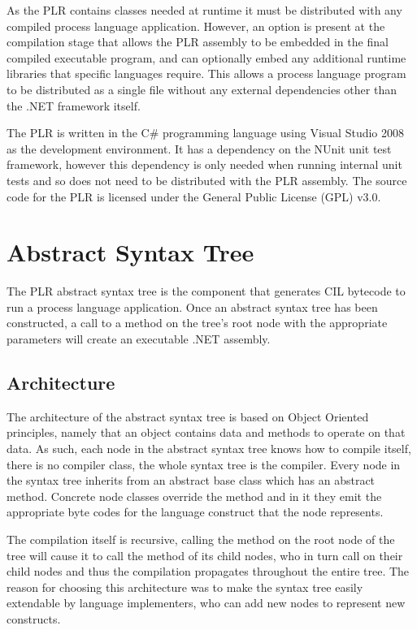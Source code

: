 	As the PLR contains classes needed at runtime it must be distributed with 
	any compiled process language application. However, an option is present at 
	the compilation stage that allows the PLR assembly to be embedded in the 
	final compiled executable program, and can optionally embed any additional 
	runtime libraries that specific languages require. This allows a process 
	language program to be distributed as a single file without any external 
	dependencies other than the .NET framework itself.

	The PLR is written in the C\# programming language using Visual 
	Studio 2008 as the development environment. It has a dependency on the NUnit 
	unit test framework, however this dependency is only needed when running 
	internal unit tests and so does not need to be distributed with the PLR 
	assembly. The source code for the PLR is licensed under the General Public 
	License (GPL) v3.0.
	
\section{Abstract Syntax Tree}

	The PLR abstract syntax tree is the component that generates CIL 
	bytecode to run a process language application. Once an abstract syntax tree 
	has been constructed, a call to a  method on the tree's root 
	node with the appropriate parameters will create an executable .NET 
	assembly. 

\subsection{Architecture}

	The architecture of the abstract syntax tree is based on Object Oriented 
	principles, namely that an object contains data and methods to operate on 
	that data. As such, each node in the abstract syntax tree knows how to 
	compile itself, there is no compiler class, the whole syntax tree is the 
	compiler. Every node in the syntax tree inherits from an abstract 
	 base class which has an abstract  
	method. Concrete node classes override the  method and in it 
	they emit the appropriate byte codes for the language construct that the 
	node represents. 
	
	The compilation itself is recursive, calling the  method 
	on the root node of the tree will cause it to call the  
	method of its child nodes, who in turn call  on their child 
	nodes and thus the compilation propagates throughout the entire tree. The 
	reason for choosing this architecture was to make the syntax tree easily 
	extendable by language implementers, who can add new nodes to represent new 
	constructs. 
	
